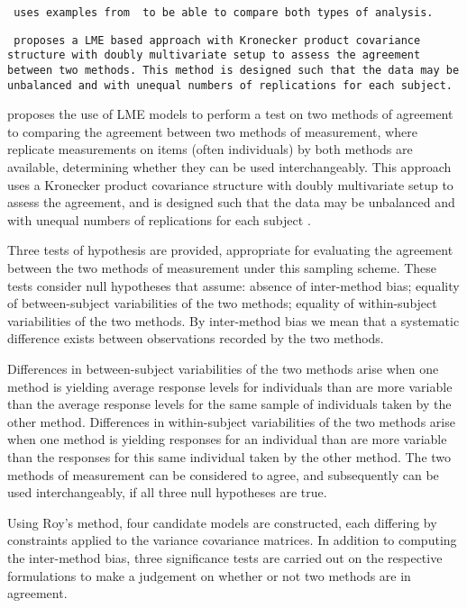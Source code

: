 \documentclass[12pt, a4paper]{report}
\theoremstyle{plain}
\theoremstyle{definition}
\theoremstyle{remark}
\begin{document}
\texttt{\citet{ARoy2009} uses examples from \citet{BA86} to be able to
	compare both types of analysis.}

\texttt{\citet{ARoy2009} proposes a LME based approach with Kronecker
	product covariance structure with doubly multivariate setup to
	assess the agreement between two methods. This method is designed
	such that the data may be unbalanced and with unequal numbers of
	replications for each subject.}


\newpage


\citet{ARoy2009} proposes the use of LME models to perform a test on two methods of agreement to comparing the agreement between two methods of measurement, where replicate measurements on items (often individuals) by both methods are available, determining whether they can be used
interchangeably. This approach uses a Kronecker product covariance structure with doubly multivariate setup to
assess the agreement, and is designed such that the data may be unbalanced and with unequal numbers of replications for each subject \citep{ARoy2009}.

Three tests of hypothesis are provided, appropriate for evaluating the agreement between the two methods of measurement under this sampling scheme. These tests consider null hypotheses that assume: absence of inter-method bias; equality of between-subject variabilities of the two methods; equality of within-subject variabilities of the two methods. By inter-method bias we mean that a systematic difference exists between observations recorded by the two methods. 

Differences in between-subject variabilities of the two methods arise when one method is yielding average response levels for individuals than are more variable than the average response levels for the same sample of individuals taken by the other method.  Differences in within-subject variabilities of the two methods arise when one method is yielding responses for an individual than are more variable than the responses for this same individual taken by the other method. The two methods of measurement can be considered to agree, and subsequently can be used interchangeably, if all three null hypotheses are true.	

\bigskip
Using Roy's method, four candidate models are constructed, each differing by constraints applied to the variance covariance matrices. In addition to computing the inter-method bias, three significance tests are carried out on the respective formulations to make a judgement on whether or not two methods are in agreement.
\bigskip
\end{document}
